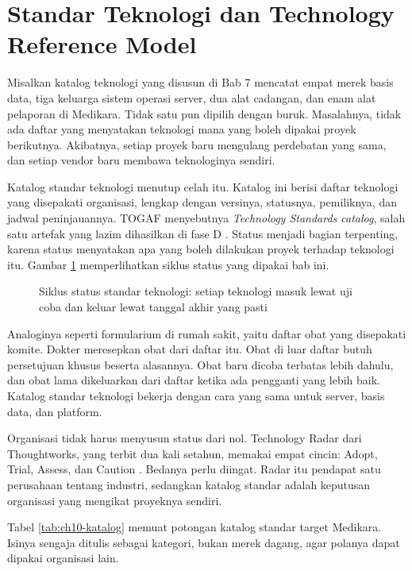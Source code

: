 \section{Standar Teknologi dan Technology Reference Model}

Misalkan katalog teknologi yang disusun di Bab 7 mencatat empat merek basis
data, tiga keluarga sistem operasi server, dua alat cadangan, dan enam alat
pelaporan di Medikara. Tidak satu pun dipilih dengan buruk. Masalahnya, tidak
ada daftar yang menyatakan teknologi mana yang boleh dipakai proyek
berikutnya. Akibatnya, setiap proyek baru mengulang perdebatan yang sama, dan
setiap vendor baru membawa teknologinya sendiri.

Katalog standar teknologi menutup celah itu. Katalog ini berisi daftar
teknologi yang disepakati organisasi, lengkap dengan versinya, statusnya,
pemiliknya, dan jadwal peninjauannya. TOGAF menyebutnya \textit{Technology
Standards catalog}, salah satu artefak yang lazim dihasilkan di fase D
\cite{togaf10}. Status menjadi bagian terpenting, karena status menyatakan
apa yang boleh dilakukan proyek terhadap teknologi itu. Gambar
\ref{fig:ch10-siklus-standar} memperlihatkan siklus status yang dipakai bab
ini.

\begin{figure}[!htb]
  \centering
  
  \caption{Siklus status standar teknologi: setiap teknologi masuk lewat uji
           coba dan keluar lewat tanggal akhir yang pasti}
  \label{fig:ch10-siklus-standar}
\end{figure}

Analoginya seperti formularium di rumah sakit, yaitu daftar obat yang
disepakati komite. Dokter meresepkan obat dari daftar itu. Obat di luar daftar
butuh persetujuan khusus beserta alasannya. Obat baru dicoba terbatas lebih
dahulu, dan obat lama dikeluarkan dari daftar ketika ada pengganti yang lebih
baik. Katalog standar teknologi bekerja dengan cara yang sama untuk server,
basis data, dan platform.

Organisasi tidak harus menyusun status dari nol. Technology Radar dari
Thoughtworks, yang terbit dua kali setahun, memakai empat cincin: Adopt,
Trial, Assess, dan Caution \cite{c10-thoughtworks-radar}. Bedanya perlu
diingat. Radar itu pendapat satu perusahaan tentang industri, sedangkan
katalog standar adalah keputusan organisasi yang mengikat proyeknya sendiri.

Tabel \ref{tab:ch10-katalog} memuat potongan katalog standar target Medikara.
Isinya sengaja ditulis sebagai kategori, bukan merek dagang, agar polanya
dapat dipakai organisasi lain.

